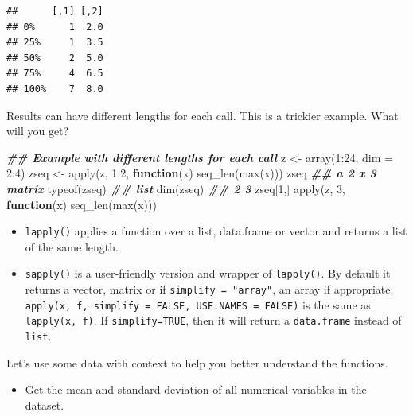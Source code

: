 \documentclass[
  12pt,
]{krantz}
\makeatletter
\newenvironment{Shaded}{\begin{snugshade}}{\end{snugshade}}
\newcommand{\AttributeTok}[1]{\textcolor[rgb]{0.61,0.61,0.61}{#1}}
\newcommand{\ControlFlowTok}[1]{\textcolor[rgb]{0.27,0.27,0.27}{\textbf{#1}}}
\newcommand{\DecValTok}[1]{\textcolor[rgb]{0.06,0.06,0.06}{#1}}
\newcommand{\DocumentationTok}[1]{\textcolor[rgb]{0.37,0.37,0.37}{\textbf{\textit{#1}}}}
\newcommand{\FunctionTok}[1]{\textcolor[rgb]{0,0,0}{#1}}
\newcommand{\NormalTok}[1]{#1}
\newcommand{\OtherTok}[1]{\textcolor[rgb]{0.37,0.37,0.37}{#1}}
\newcommand{\SpecialCharTok}[1]{\textcolor[rgb]{0,0,0}{#1}}
\providecommand{\tightlist}{%
  \setlength{\itemsep}{0pt}\setlength{\parskip}{0pt}}
\newenvironment{kframe}{%
\medskip{}
\setlength{\fboxsep}{.8em}
 \def\at@end@of@kframe{}%
 \ifinner\ifhmode%
  \def\at@end@of@kframe{\end{minipage}}%
  \begin{minipage}{\columnwidth}%
 \fi\fi%
 \def\FrameCommand##1{\hskip\@totalleftmargin \hskip-\fboxsep
 \colorbox{shadecolor}{##1}\hskip-\fboxsep
     \hskip-\linewidth \hskip-\@totalleftmargin \hskip\columnwidth}%
 \MakeFramed {\advance\hsize-\width
   \@totalleftmargin\z@ \linewidth\hsize
   \@setminipage}}%
 {\par\unskip\endMakeFramed%
 \at@end@of@kframe}
\renewenvironment{Shaded}{\begin{kframe}}{\end{kframe}}
\makeatother
\begin{document}
\begin{verbatim}
##      [,1] [,2]
## 0%      1  2.0
## 25%     1  3.5
## 50%     2  5.0
## 75%     4  6.5
## 100%    7  8.0
\end{verbatim}

Results can have different lengths for each call. This is a trickier example. What will you get?

\begin{Shaded}
\begin{Highlighting}[]
\DocumentationTok{\#\# Example with different lengths for each call}
\NormalTok{z }\OtherTok{\textless{}{-}} \FunctionTok{array}\NormalTok{(}\DecValTok{1}\SpecialCharTok{:}\DecValTok{24}\NormalTok{, }\AttributeTok{dim =} \DecValTok{2}\SpecialCharTok{:}\DecValTok{4}\NormalTok{)}
\NormalTok{zseq }\OtherTok{\textless{}{-}} \FunctionTok{apply}\NormalTok{(z, }\DecValTok{1}\SpecialCharTok{:}\DecValTok{2}\NormalTok{, }\ControlFlowTok{function}\NormalTok{(x) }\FunctionTok{seq\_len}\NormalTok{(}\FunctionTok{max}\NormalTok{(x)))}
\NormalTok{zseq         }\DocumentationTok{\#\# a 2 x 3 matrix}
\FunctionTok{typeof}\NormalTok{(zseq) }\DocumentationTok{\#\# list}
\FunctionTok{dim}\NormalTok{(zseq) }\DocumentationTok{\#\# 2 3}
\NormalTok{zseq[}\DecValTok{1}\NormalTok{,]}
\FunctionTok{apply}\NormalTok{(z, }\DecValTok{3}\NormalTok{, }\ControlFlowTok{function}\NormalTok{(x) }\FunctionTok{seq\_len}\NormalTok{(}\FunctionTok{max}\NormalTok{(x)))}
\end{Highlighting}
\end{Shaded}

\begin{itemize}
\tightlist
\item
  \texttt{lapply()} applies a function over a list, data.frame or vector and returns a list of the same length.
\item
  \texttt{sapply()} is a user-friendly version and wrapper of \texttt{lapply()}. By default it returns a vector, matrix or if \texttt{simplify\ =\ "array"}, an array if appropriate. \texttt{apply(x,\ f,\ simplify\ =\ FALSE,\ USE.NAMES\ =\ FALSE)} is the same as \texttt{lapply(x,\ f)}. If \texttt{simplify=TRUE}, then it will return a \texttt{data.frame} instead of \texttt{list}.
\end{itemize}

Let's use some data with context to help you better understand the functions.

\begin{itemize}
\tightlist
\item
  Get the mean and standard deviation of all numerical variables in the dataset.
\end{itemize}
\end{document}
